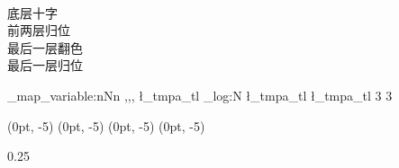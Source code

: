 \documentclass{article}
\begin{document}
\NewCoffin \CrossText
\NewCoffin \FLLText
\NewCoffin \OLLText
\NewCoffin \PLLText
\SetVerticalCoffin \CrossText {2\stepsunit} {
    \centering\sffamily\heiti\LARGE
    \\底层十字}
\SetVerticalCoffin \FLLText {2\stepsunit} {
    \centering\sffamily\heiti\LARGE
    \\前两层归位}
\SetVerticalCoffin \OLLText {2\stepsunit} {
    \centering\sffamily\heiti\LARGE
    \\最后一层翻色}
\SetVerticalCoffin \PLLText {2\stepsunit} {
    \centering\sffamily\heiti\LARGE
    \\最后一层归位}

\ExplSyntaxOn
\clist_map_variable:nNn {\CrossText,\FLLText,\OLLText,\PLLText} \l_tmpa_tl
    {
        \tl_log:N \l_tmpa_tl
        \expandafter\ScaleCoffin\l_tmpa_tl {3} {3}}
\ExplSyntaxOff

\JoinCoffins {} \CrossText[t,hc] (0pt, -5\stepsgap)
\JoinCoffins {} \FLLText[t,hc] (0pt, -5\stepsgap)
\JoinCoffins {} \OLLText[t,hc] (0pt, -5\stepsgap)
\JoinCoffins {} \PLLText[t,hc] (0pt, -5\stepsgap)

\ScaleCoffin {} {0.25}
\tcbox[colframe=orange,arc=5mm]{\TypesetCoffin \StepsCoffin}
\end{document}

